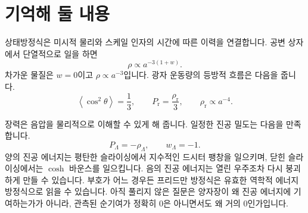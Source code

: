 \begin{classroomqa}
\end{classroomqa}

\begin{classroomqa}
\end{classroomqa}

\section{기억해 둘 내용}

상태방정식은 미시적 물리와 스케일 인자의 시간에 따른 이력을 연결합니다. 공변 상자에서 단열적으로 일을 하면
\[
\rho\propto a^{-3(1+w)}.
\]
차가운 물질은 \(w=0\)이고 \(\rho\propto a^{-3}\)입니다. 광자 운동량의 등방적 흐름은 다음을 줍니다.
\[
\left\langle\cos^2\theta\right\rangle=\frac13,
\qquad
P_{\mathrm r}=\frac{\rho_{\mathrm r}}{3},
\qquad
\rho_{\mathrm r}\propto a^{-4}.
\]

장력은 음압을 물리적으로 이해할 수 있게 해 줍니다. 일정한 진공 밀도는 다음을 만족합니다.
\[
P_\Lambda=-\rho_\Lambda,
\qquad
w_\Lambda=-1.
\]
양의 진공 에너지는 평탄한 슬라이싱에서 지수적인 드시터 팽창을 일으키며, 닫힌 슬라이싱에서는 \(\cosh\) 바운스를 일으킵니다. 음의 진공 에너지는 열린 우주조차 다시 붕괴하게 만들 수 있습니다. 부호가 어느 경우든 프리드만 방정식은 유효한 역학적 에너지 방정식으로 읽을 수 있습니다. 아직 풀리지 않은 질문은 양자장이 왜 진공 에너지에 기여하는가가 아니라, 관측된 순기여가 정확히 0은 아니면서도 왜 거의 0인가입니다.
